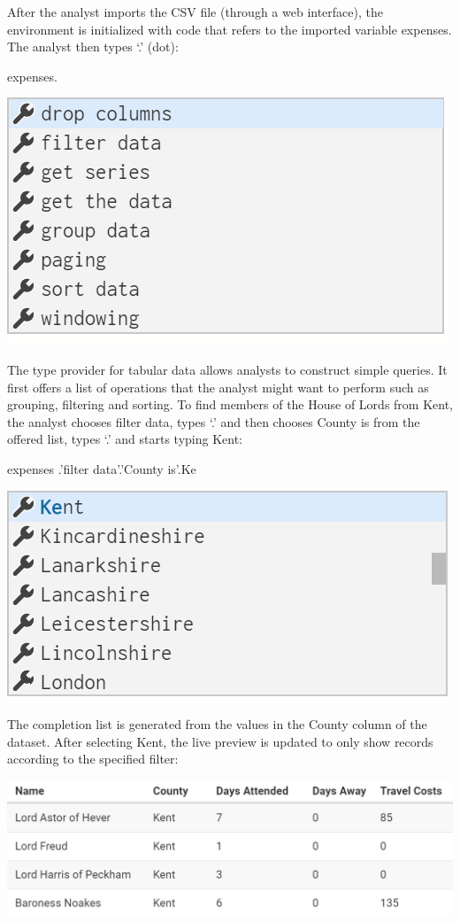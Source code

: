 \documentclass{sigchi}
\newcommand{\ikvd}[1]{{\fontfamily{zi4}\selectfont\small #1}}
\begin{document}
After the analyst imports the CSV file (through a web interface), the environment is initialized
with code that refers to the imported variable \ikvd{expenses}. The analyst then types `.' (dot):

\begin{thegamma}
expenses.
\end{thegamma}
\vspace{-0.4em}\qquad\includegraphics[width=0.5\columnwidth]{figures/lords1}

The type provider for tabular data allows analysts to construct simple queries. It first offers
a list of operations that the analyst might want to perform such as grouping, filtering and sorting.
To find members of the House of Lords from Kent, the analyst chooses \ikvd{filter data},
types `.' and then chooses \ikvd{County is} from the offered list, types `.' and starts
typing Kent:

\begin{thegamma}
expenses
  .'filter data'.'County is'.Ke
\end{thegamma}
\vspace{-0.4em}\qquad\includegraphics[width=0.5\columnwidth]{figures/lords2}

The completion list is generated from the values in the \ikvd{County} column of the dataset.
After selecting \ikvd{Kent}, the live preview is updated to only show records according to the
specified filter:

\includegraphics[width=1\columnwidth]{figures/lords3}
\end{document}
